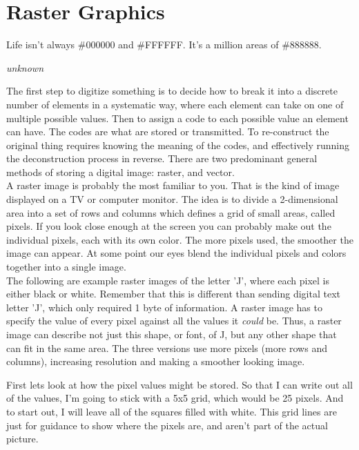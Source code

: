 \section{Raster Graphics}

\epigraph{Life isn't always \#000000 and \#FFFFFF. It's a million areas of \#888888.}{\textit{unknown}}

The first step to digitize something is to decide how to break it into a discrete number of elements in a systematic way, where each element can take on one of multiple possible values. Then to assign a code to each possible value an element can have. The codes are what are stored or transmitted. To re-construct the original thing requires knowing the meaning of the codes, and effectively running the deconstruction process in reverse. There are two predominant general methods of storing a digital image: raster, and vector.\\

A raster image is probably the most familiar to you. That is the kind of image displayed on a TV or computer monitor. The idea is to divide a 2-dimensional area into a set of rows and columns which defines a grid of small areas, called pixels. If you look close enough at the screen you can probably make out the individual pixels, each with its own color. The more pixels used, the smoother the image can appear. At some point our eyes blend the individual pixels and colors together into a single image.\\

The following are example raster images of the letter 'J', where each pixel is either black or white. Remember that this is different than sending digital text letter 'J', which only required 1 byte of information. A raster image has to specify the value of every pixel against all the values it \textit{could} be. Thus, a raster image can describe not just this shape, or font, of J, but any other shape that can fit in the same area. The three versions use more pixels (more rows and columns), increasing resolution and making a smoother looking image.\\

\begin{center}\end{center}

First lets look at how the pixel values might be stored. So that I can write out all of the values, I'm going to stick with a 5x5 grid, which would be 25 pixels. And to start out, I will leave all of the squares filled with white. This grid lines are just for guidance to show where the pixels are, and aren't part of the actual picture.\\


